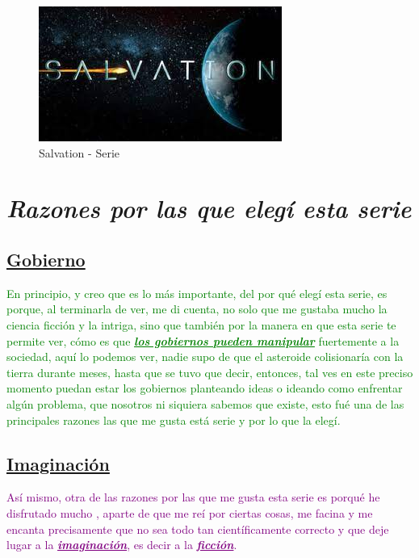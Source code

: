 \documentclass[a5paper,11pt]{article}
\begin{document}
\begin{figure}
    
    \begin{flushright}
    \caption*{Salvation - Serie }
    \includegraphics[scale=0.40,angle=15]{salvation.jpg}
    \end{flushright}
\end{figure}    

\pagestyle{fancy}

    \fancyhf{}
    \rfoot{\thepage}
    
\section{\Large{\emph{Razones por las que elegí esta serie}}}
    \subsection{\large{\underline{Gobierno}}} \small{\textcolor{green}{En principio, y creo que es lo más importante, del por qué elegí esta serie, es porque, al terminarla de ver, me di cuenta, no solo que me gustaba mucho la ciencia ficción y la intriga, sino que también por la manera en que esta serie te permite ver, cómo es que {\textbf{\emph{\underline{los gobiernos  pueden manipular}}}} fuertemente a la sociedad, aquí lo podemos ver, nadie supo de que el asteroide colisionaría con la tierra durante meses, hasta que se tuvo que decir, entonces, tal ves en este preciso momento puedan estar los gobiernos planteando ideas o ideando como enfrentar algún problema, que nosotros ni siquiera sabemos que existe, esto fué una de las principales razones las que me gusta está serie y por lo que la elegí.}}
    
    \subsection{\large{\underline{Imaginación}}} \small{\textcolor{purple}{Así mismo, otra de las razones por las que me gusta esta serie es porqué he disfrutado mucho , aparte de que me reí por ciertas cosas, me facina y me encanta precisamente que no sea todo tan científicamente correcto y que deje lugar a la {\textbf{\emph{\underline{imaginación}}}}, es decir a la {\textbf{\emph{\underline{ficción}}}}.}}
    
\end{document}
